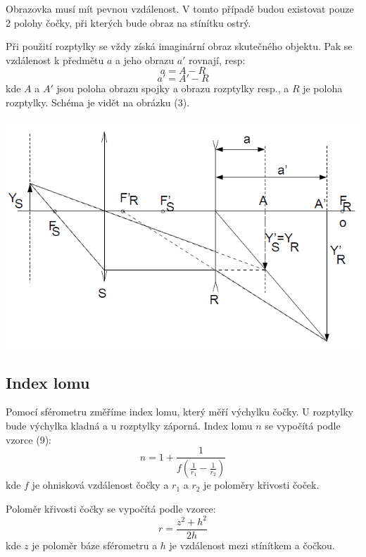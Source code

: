 \documentclass[a4paper,11pt]{article}
\begin{document}
    \begin{minipage}[t]{0.5\textwidth} 
                Obrazovka musí mít pevnou vzdálenost. V tomto případě budou existovat pouze 2 polohy čočky, při kterých bude obraz na stínítku ostrý.
                \par Při použití rozptylky se vždy získá imaginární obraz skutečného objektu. Pak se vzdálenost k předmětu $a$ a jeho obrazu $a'$ rovnají, resp:
                \begin{equation}
                    a = A - R
                \end{equation}
                \begin{equation}
                    a' = A' - R
                \end{equation}
                kde $A$ a $A'$ jsou poloha obrazu spojky a obrazu rozptylky resp., a $R$ je poloha rozptylky.
                Schéma je vidět na obrázku (3).
                \vspace{10pt}   
                \par \centering
                \includegraphics[scale=0.4]{rozp}
                \captionsetup{justification=centering, font=footnotesize}
                \label{fig:rozp}
                \vspace{10pt}
                \raggedright
            \subsection{Index lomu}
                Pomocí sférometru změříme index lomu, který měří výchylku čočky. U rozptylky bude výchylka kladná a u rozptylky záporná. Index lomu $n$ se vypočítá podle vzorce (9): 
                \begin{equation}
                    n = 1 + \frac{1}{f \left( \frac{1}{r_1} - \frac{1}{r_2} \right)}
                \end{equation}
                kde $f$ je ohnisková vzdálenost čočky a $r_1$ a $r_2$ je poloměry křivosti čoček.
                \par Poloměr křivosti čočky se vypočítá podle vzorce:
                \begin{equation}
                    r = \frac{z^2+h^2}{2h}
                \end{equation}
                kde $z$ je poloměr báze sférometru a $h$ je vzdálenost mezi stínítkem a čočkou.
            \end{minipage}
\end{document}
